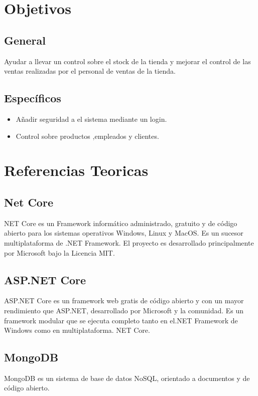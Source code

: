 \documentclass[12pt,letterpaper]{article}
\begin{document}
\section{Objetivos}
    \subsection{General}
    Ayudar a llevar un control sobre el stock de la tienda y mejorar el control de las ventas realizadas por el personal de ventas de la tienda.
    \subsection{Específicos}
    \begin{itemize}
        \item Añadir seguridad a el sistema mediante un login.
        \item Control sobre productos ,empleados y clientes.
    \end{itemize}

\section{Referencias Teoricas}

\subsection{Net Core}

NET Core es un Framework informático administrado, gratuito y de código abierto para los sistemas operativos Windows, Linux y MacOS. Es un sucesor multiplataforma de .NET Framework. El proyecto es desarrollado principalmente por Microsoft bajo la Licencia MIT.

\subsection{ASP.NET Core}

ASP.NET Core es un framework web gratis de código abierto y con un mayor rendimiento que ASP.NET, desarrollado por Microsoft y la comunidad. Es un framework modular que se ejecuta completo tanto en el.NET Framework de Windows como en multiplataforma. NET Core.

\subsection{MongoDB}

MongoDB es un sistema de base de datos NoSQL, orientado a documentos y de código abierto.
\end{document}

